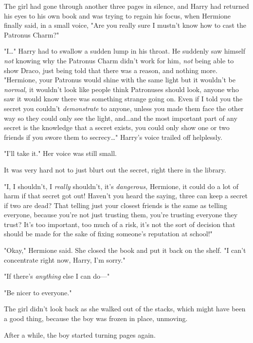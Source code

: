 The girl had gone through another three pages in silence, and Harry had
returned his eyes to his own book and was trying to regain his focus, when
Hermione finally said, in a small voice, "Are you really sure I mustn't know
how to cast the Patronus Charm?"

"I…" Harry had to swallow a sudden lump in his throat. He suddenly saw
himself \emph{not} knowing why the Patronus Charm didn't work for him,
\emph{not} being able to show Draco, just being told that there was a reason,
and nothing more. "Hermione, your Patronus would shine with the same light but
it wouldn't be \emph{normal,} it wouldn't look like people think Patronuses
should look, anyone who saw it would know there was something strange going on.
Even if I told you the secret you couldn't \emph{demonstrate} to anyone, unless
you made them face the other way so they could only see the light, and…and
the most important part of any secret is the knowledge that a secret
exists, you could only show one or two friends if you swore them to
secrecy…" Harry's voice trailed off helplessly.

"I'll take it." Her voice was still small.

It was very hard not to just blurt out the secret, right there in the library.

"I, I shouldn't, I \emph{really} shouldn't, it's \emph{dangerous,} Hermione, it
could do a lot of harm if that secret got out! Haven't you heard the saying,
three can keep a secret if two are dead? That telling just your closest friends
is the same as telling everyone, because you're not just trusting them, you're
trusting everyone they trust? It's too important, too much of a risk, it's not
the sort of decision that should be made for the sake of fixing someone's
reputation at school!"

"Okay," Hermione said. She closed the book and put it back on the shelf. "I
can't concentrate right now, Harry, I'm sorry."

"If there's \emph{anything} else I can do---"

"Be nicer to everyone."

The girl didn't look back as she walked out of the stacks, which might have
been a good thing, because the boy was frozen in place, unmoving.

After a while, the boy started turning pages again.
